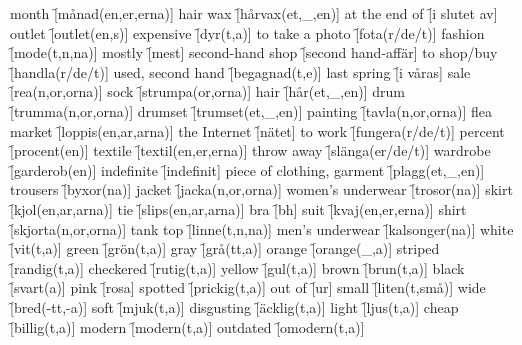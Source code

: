 \begin{questions}
    \begin{multicols}{2}
        \raggedcolumns
        \question month \f[månad(en,er,erna)]
        \question hair wax \f[hårvax(et,\_,en)]
        \question at the end of \f[i slutet av]
        \question outlet \f[outlet(en,s)]
        \question expensive \f[dyr(t,a)]
        \question to take a photo \f[fota(r/de/t)]
        \question fashion \f[mode(t,n,na)]
        \question mostly \f[mest]
        \question second-hand shop \f[second hand-affär]
        \question to shop/buy \f[handla(r/de/t)]
        \question used, second hand \f[begagnad(t,e)]
        \question last spring \f[i våras]
        \question sale \f[rea(n,or,orna)]
        \question sock \f[strumpa(or,orna)]
        \question hair \f[hår(et,\_,en)]
        \question drum \f[trumma(n,or,orna)]
        \question drumset \f[trumset(et,\_,en)]
        \question painting \f[tavla(n,or,orna)]
        \question flea market \f[loppis(en,ar,arna)]
        \question the Internet \f[nätet]
        \question to work \f[fungera(r/de/t)]
        \question percent \f[procent(en)]
        \question textile \f[textil(en,er,erna)]
        \question throw away \f[slänga(er/de/t)]
        \question wardrobe \f[garderob(en)]
        \question indefinite \f[indefinit]
        \question piece of clothing, garment \f[plagg(et,\_,en)]
        \question trousers \f[byxor(na)]
        \question jacket \f[jacka(n,or,orna)]
        \question women's underwear \f[trosor(na)]
        \question skirt \f[kjol(en,ar,arna)]
        \question tie \f[slips(en,ar,arna)]
        \question bra \f[bh]
        \question suit \f[kvaj(en,er,erna)]
        \question shirt \f[skjorta(n,or,orna)]
        \question tank top \f[linne(t,n,na)]
        \question men's underwear \f[kalsonger(na)]
        \question white \f[vit(t,a)]
        \question green \f[grön(t,a)]
        \question gray \f[grå(tt,a)]
        \question orange \f[orange(\_,a)]
        \question striped \f[randig(t,a)]
        \question checkered \f[rutig(t,a)]
        \question yellow \f[gul(t,a)]
        \question brown \f[brun(t,a)]
        \question black \f[svart(a)]
        \question pink \f[rosa]
        \question spotted \f[prickig(t,a)]
        \question out of \f[ur]
        \question small \f[liten(t,små)]
        \question wide \f[bred(-tt,-a)]
        \question soft \f[mjuk(t,a)]
        \question disgusting \f[äcklig(t,a)]
        \question light \f[ljus(t,a)]
        \question cheap \f[billig(t,a)]
        \question modern \f[modern(t,a)]
        \question outdated \f[omodern(t,a)]

\end{multicols}
\end{questions}
